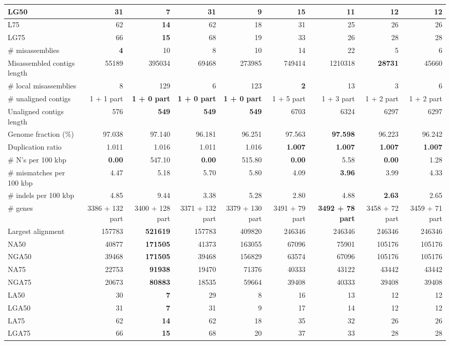 \documentclass[12pt,a4paper]{article}
\begin{document}
\begin{table}[ht]
\begin{center}
\begin{tabular}{|l*{8}{|r}|}
LG50 & 31 & {\bf 7} & 31 & 9 & 15 & 11 & 12 & 12 \\ \hline
L75 & 62 & {\bf 14} & 62 & 18 & 31 & 25 & 26 & 26 \\ \hline
LG75 & 66 & {\bf 15} & 68 & 19 & 33 & 26 & 28 & 28 \\ \hline
\# misassemblies & {\bf 4} & 10 & 8 & 10 & 14 & 22 & 5 & 6 \\ \hline
Misassembled contigs length & 55189 & 395034 & 69468 & 273985 & 749414 & 1210318 & {\bf 28731} & 45660 \\ \hline
\# local misassemblies & 8 & 129 & 6 & 123 & {\bf 2} & 13 & 3 & 6 \\ \hline
\# unaligned contigs & 1 + 1 part & {\bf 1 + 0 part} & {\bf 1 + 0 part} & {\bf 1 + 0 part} & 1 + 5 part & 1 + 3 part & 1 + 2 part & 1 + 2 part \\ \hline
Unaligned contigs length & 576 & {\bf 549} & {\bf 549} & {\bf 549} & 6703 & 6324 & 6297 & 6297 \\ \hline
Genome fraction (\%) & 97.038 & 97.140 & 96.181 & 96.251 & 97.563 & {\bf 97.598} & 96.223 & 96.242 \\ \hline
Duplication ratio & 1.011 & 1.016 & 1.011 & 1.016 & {\bf 1.007} & {\bf 1.007} & {\bf 1.007} & {\bf 1.007} \\ \hline
\# N's per 100 kbp & {\bf 0.00} & 547.10 & {\bf 0.00} & 515.80 & {\bf 0.00} & 5.58 & {\bf 0.00} & 1.28 \\ \hline
\# mismatches per 100 kbp & 4.47 & 5.18 & 5.70 & 5.80 & 4.09 & {\bf 3.96} & 3.99 & 4.33 \\ \hline
\# indels per 100 kbp & 4.85 & 9.44 & 3.38 & 5.28 & 2.80 & 4.88 & {\bf 2.63} & 2.65 \\ \hline
\# genes & 3386 + 132 part & 3400 + 128 part & 3371 + 132 part & 3379 + 130 part & 3491 + 79 part & {\bf 3492 + 78 part} & 3458 + 72 part & 3459 + 71 part \\ \hline
Largest alignment & 157783 & {\bf 521619} & 157783 & 409820 & 246346 & 246346 & 246346 & 246346 \\ \hline
NA50 & 40877 & {\bf 171505} & 41373 & 163055 & 67096 & 75901 & 105176 & 105176 \\ \hline
NGA50 & 39468 & {\bf 171505} & 39468 & 156829 & 63574 & 67096 & 105176 & 105176 \\ \hline
NA75 & 22753 & {\bf 91938} & 19470 & 71376 & 40333 & 43122 & 43442 & 43442 \\ \hline
NGA75 & 20673 & {\bf 80883} & 18535 & 59664 & 39408 & 40333 & 39408 & 39408 \\ \hline
LA50 & 30 & {\bf 7} & 29 & 8 & 16 & 13 & 12 & 12 \\ \hline
LGA50 & 31 & {\bf 7} & 31 & 9 & 17 & 14 & 12 & 12 \\ \hline
LA75 & 62 & {\bf 14} & 62 & 18 & 35 & 32 & 26 & 26 \\ \hline
LGA75 & 66 & {\bf 15} & 68 & 20 & 37 & 33 & 28 & 28 \\ \hline
\end{tabular}
\end{center}
\end{table}
\end{document}
